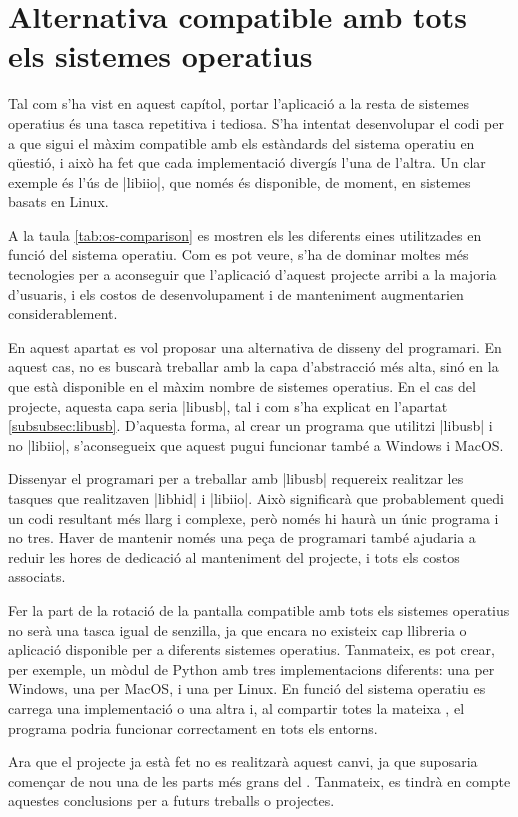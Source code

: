 \section{Alternativa compatible amb tots els sistemes operatius}
\label{sec:winmac-conclusions}

Tal com s'ha vist en aquest capítol, portar l'aplicació a la resta de sistemes
operatius és una tasca repetitiva i tediosa. S'ha intentat desenvolupar el codi
per a que sigui el màxim compatible amb els estàndards del sistema operatiu en
qüestió, i això ha fet que cada implementació divergís l'una de l'altra. Un clar
exemple és l'ús de \ord|libiio|, que només és disponible, de moment, en sistemes
basats en Linux.

A la taula \ref{tab:os-comparison} es mostren els les diferents eines
utilitzades en funció del sistema operatiu. Com es pot veure, s'ha de dominar
moltes més tecnologies per a aconseguir que l'aplicació d'aquest projecte arribi
a la majoria d'usuaris, i els costos de desenvolupament i de manteniment
augmentarien considerablement.



En aquest apartat es vol proposar una alternativa de disseny del programari. En
aquest cas, no es buscarà treballar amb la capa d'abstracció més alta, sinó en
la que està disponible en el màxim nombre de sistemes operatius. En el cas del
projecte, aquesta capa seria \ord|libusb|, tal i com s'ha explicat en l'apartat
\ref{subsubsec:libusb}. D'aquesta forma, al crear un programa que utilitzi
\ord|libusb| i no \ord|libiio|, s'aconsegueix que aquest pugui funcionar també
a Windows i MacOS.

Dissenyar el programari per a treballar amb \ord|libusb| requereix realitzar
les tasques que realitzaven \ord|libhid| i \ord|libiio|. Això significarà que
probablement quedi un codi resultant més llarg i complexe, però només hi haurà
un únic programa i no tres. Haver de mantenir només una peça de programari
també ajudaria a reduir les hores de dedicació al manteniment del projecte, i
tots els costos associats.

Fer la part de la rotació de la pantalla compatible amb tots els sistemes
operatius no serà una tasca igual de senzilla, ja que encara no existeix cap
llibreria o aplicació disponible per a diferents sistemes operatius. Tanmateix,
es pot crear, per exemple, un mòdul de Python amb tres implementacions
diferents: una per Windows, una per MacOS, i una per Linux. En funció del
sistema operatiu es carrega una implementació o una altra i, al compartir
totes la mateixa , el programa podria funcionar correctament en tots
els entorns.

Ara que el projecte ja està fet no es realitzarà aquest canvi, ja que suposaria
començar de nou una de les parts més grans del . Tanmateix, es tindrà
en compte aquestes conclusions per a futurs treballs o projectes.

